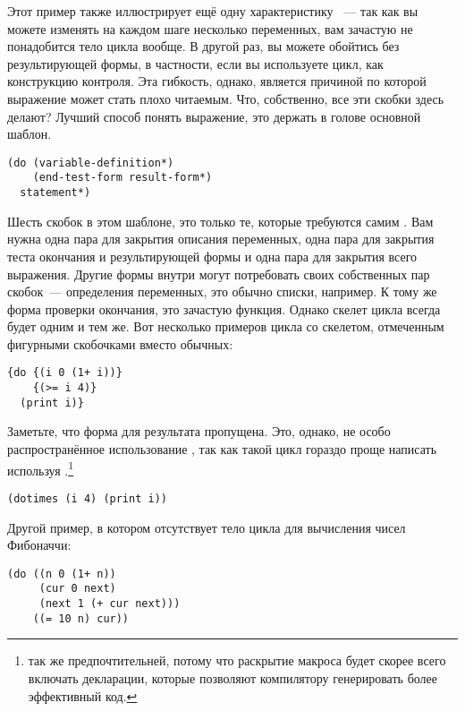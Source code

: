 Этот пример также иллюстрирует ещё одну характеристику ~--- так как вы можете
изменять на каждом шаге несколько переменных, вам зачастую не понадобится тело цикла
вообще. В другой раз, вы можете обойтись без результирующей формы, в частности, если вы
используете цикл, как конструкцию контроля. Эта гибкость, однако, является причиной по
которой выражение  может стать плохо читаемым. Что, собственно, все эти скобки
здесь делают? Лучший способ понять  выражение, это держать в голове основной
шаблон.

\begin{lstlisting}
(do (variable-definition*)
    (end-test-form result-form*)
  statement*)
\end{lstlisting}

Шесть скобок в этом шаблоне, это только те, которые требуются самим . Вам нужна
одна пара для закрытия описания переменных, одна пара для закрытия теста окончания и
результирующей формы и одна пара для закрытия всего выражения. Другие формы внутри
 могут потребовать своих собственных пар скобок~--- определения переменных, это
обычно списки, например. К тому же форма проверки окончания, это зачастую функция. Однако
скелет  цикла всегда будет одним и тем же. Вот несколько примеров цикла 
со скелетом, отмеченным фигурными скобочками вместо обычных:

\begin{lstlisting}
{do {(i 0 (1+ i))}
    {(>= i 4)}
  (print i)}
\end{lstlisting}

Заметьте, что форма для результата пропущена. Это, однако, не особо распространённое
использование , так как такой цикл гораздо проще написать используя
.\footnote{ так же предпочтительней, потому что раскрытие
  макроса будет скорее всего включать декларации, которые позволяют компилятору
  генерировать более эффективный код.}

\begin{lstlisting}
(dotimes (i 4) (print i))
\end{lstlisting}

Другой пример, в котором отсутствует тело цикла для вычисления чисел Фибоначчи:

\begin{lstlisting}
(do ((n 0 (1+ n))
     (cur 0 next)
     (next 1 (+ cur next)))
    ((= 10 n) cur))
\end{lstlisting}

